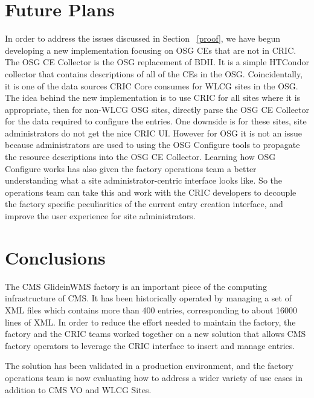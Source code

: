 \documentclass{webofc}
\begin{document}
\section{Future Plans}
\label{future}

In order to address the issues discussed in Section ~\ref{proof}, we have begun developing a new implementation focusing on OSG CEs that are not in CRIC. The OSG CE Collector is the OSG replacement of BDII. It is a simple HTCondor collector that contains descriptions of all of the CEs in the OSG. Coincidentally, it is one of the data sources CRIC Core consumes for WLCG sites in the OSG. The idea behind the new implementation is to use CRIC for all sites where it is appropriate, then for non-WLCG OSG sites, directly parse the OSG CE Collector for the data required to configure the entries. One downside is for these sites, site administrators do not get the nice CRIC UI. However for OSG it is not an issue because administrators are used to using the OSG Configure tools to propagate the resource descriptions into the OSG CE Collector. Learning how OSG Configure works has also given the factory operations team a better understanding what a site administrator-centric interface looks like. So the operations team can take this and work with the CRIC developers to decouple the factory specific peculiarities of the current entry creation interface, and improve the user experience for site administrators.

\section{Conclusions}
\label{conclusions}
The CMS GlideinWMS factory is an important piece of the computing infrastructure of CMS. It has been historically operated by managing a set of XML files which contains more than 400 entries, corresponding to about 16000 lines of XML. In order to reduce the effort needed to maintain the factory, the factory and the CRIC teams worked together on a new solution that allows CMS factory operators to leverage the CRIC interface to insert and manage entries. 

The solution has been validated in a production environment, and the factory operations team is now evaluating how to address a wider variety of use cases in addition to CMS VO and WLCG Sites.

\section*{}
\label{acknowledgements}
\end{document}
